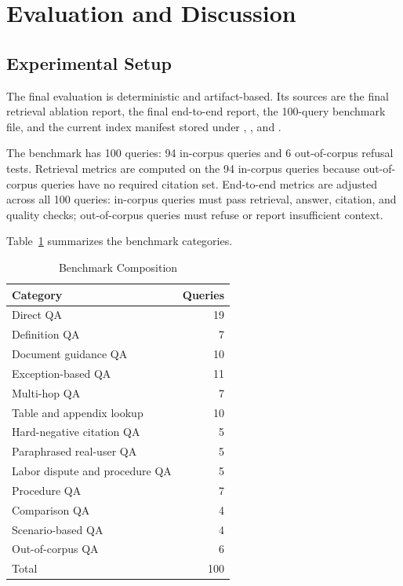 \section{Evaluation and Discussion}

\subsection{Experimental Setup}
The final evaluation is deterministic and artifact-based. Its sources are the final retrieval ablation report, the final end-to-end report, the 100-query benchmark file, and the current index manifest stored under , , and .

The benchmark has 100 queries: 94 in-corpus queries and 6 out-of-corpus refusal tests. Retrieval metrics are computed on the 94 in-corpus queries because out-of-corpus queries have no required citation set. End-to-end metrics are adjusted across all 100 queries: in-corpus queries must pass retrieval, answer, citation, and quality checks; out-of-corpus queries must refuse or report insufficient context.

Table~\ref{tab:benchmark-composition-final} summarizes the benchmark categories.

\begin{table}[H]
  \centering
  \caption{Benchmark Composition}
  \label{tab:benchmark-composition-final}
  \small
  \begin{tabular}{@{}lr@{}}
    \toprule
    Category & Queries \\
    \midrule
    Direct QA & 19 \\
    Definition QA & 7 \\
    Document guidance QA & 10 \\
    Exception-based QA & 11 \\
    Multi-hop QA & 7 \\
    Table and appendix lookup & 10 \\
    Hard-negative citation QA & 5 \\
    Paraphrased real-user QA & 5 \\
    Labor dispute and procedure QA & 5 \\
    Procedure QA & 7 \\
    Comparison QA & 4 \\
    Scenario-based QA & 4 \\
    Out-of-corpus QA & 6 \\
    \midrule
    Total & 100 \\
    \bottomrule
  \end{tabular}
\end{table}


